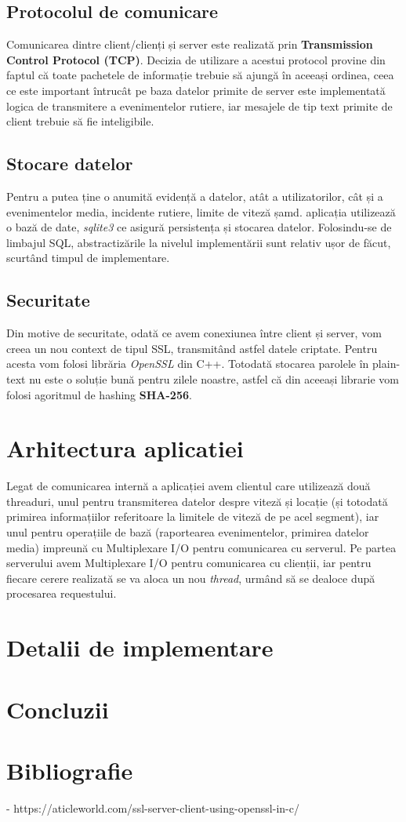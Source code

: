 \documentclass{article}
\begin{document}
\subsection{Protocolul de comunicare}
Comunicarea dintre client/clienți și server este realizată prin  \textbf{Transmission Control Protocol (TCP)}. Decizia de utilizare a acestui protocol provine din faptul că toate pachetele de informație trebuie să ajungă în aceeași ordinea, ceea ce este important întrucât pe baza datelor primite de server este implementată logica de transmitere a evenimentelor rutiere, iar  mesajele de tip text primite de client trebuie să fie inteligibile. 

\subsection{Stocare datelor}
Pentru a putea ține o anumită evidență a datelor, atât a utilizatorilor, cât și a evenimentelor media, incidente rutiere, limite de viteză șamd. aplicația utilizează o bază de date, \textit{sqlite3} ce asigură persistența și stocarea datelor. Folosindu-se de limbajul SQL, abstractizările la nivelul implementării sunt relativ ușor de făcut, scurtând timpul de implementare.

\subsection{Securitate}
Din motive de securitate, odată ce avem conexiunea între client și server, vom creea un nou context de tipul SSL, transmitând astfel datele criptate. Pentru acesta vom folosi librăria \textit{OpenSSL} din C++. Totodată stocarea parolele în plain-text nu este o soluție bună pentru zilele noastre, astfel că din aceeași librarie vom folosi agoritmul de hashing \textbf{SHA-256}.

\section{Arhitectura aplicatiei}
Legat de comunicarea internă a aplicației avem clientul care utilizează două threaduri, unul pentru transmiterea datelor despre viteză și locație (și totodată primirea informațiilor referitoare la limitele de viteză de pe acel segment), iar unul pentru operațiile de bază (raportearea evenimentelor, primirea datelor media) impreună cu Multiplexare I/O pentru comunicarea cu serverul. Pe partea serverului avem Multiplexare I/O pentru comunicarea cu clienții, iar pentru fiecare cerere realizată se va aloca un nou \textit{thread}, urmând să se dealoce după procesarea requestului.
\section{Detalii de implementare}
\section{Concluzii}
\section{Bibliografie}
- https://aticleworld.com/ssl-server-client-using-openssl-in-c/
\end{document}
